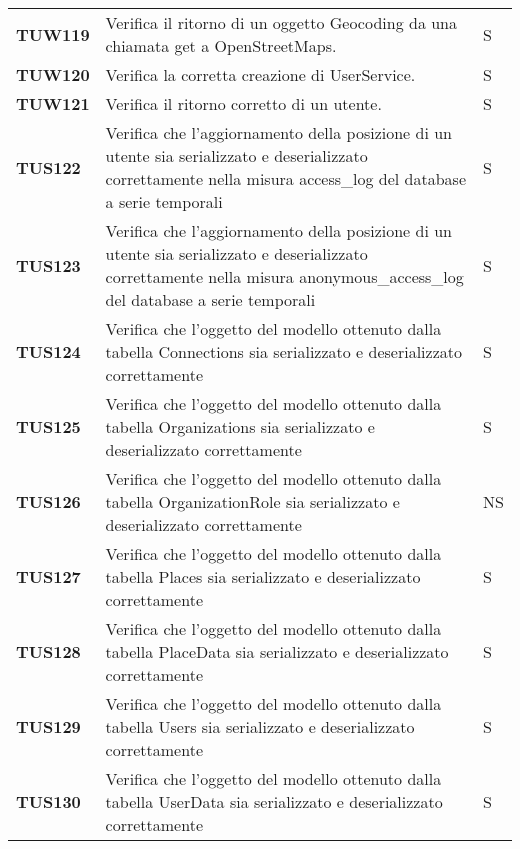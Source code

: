 \documentclass[../../piano-di-qualifica.tex]{subfiles}
\begin{document}
\begin{longtable}[H]{>{\centering\bfseries}m{3cm} >{}m{10cm} >{\centering\arraybackslash}m{3cm}}
  TUW119             & Verifica il ritorno di un oggetto Geocoding da una chiamata get a OpenStreetMaps.                                   & S                             \\


  TUW120             & Verifica la corretta creazione di UserService.                                                                      & S                             \\

  TUW121             & Verifica il ritorno corretto di un utente.                                                                          & S                             \\


  TUS122 & Verifica che l'aggiornamento della posizione di un utente sia serializzato e deserializzato correttamente nella misura access\_log del database a serie temporali & S \\
  TUS123 & Verifica che l'aggiornamento della posizione di un utente sia serializzato e deserializzato correttamente nella misura anonymous\_access\_log del database a serie temporali & S \\


  TUS124 & Verifica che l'oggetto del modello ottenuto dalla tabella Connections sia serializzato e deserializzato correttamente & S \\
  TUS125 & Verifica che l'oggetto del modello ottenuto dalla tabella Organizations sia serializzato e deserializzato correttamente & S \\
  TUS126 & Verifica che l'oggetto del modello ottenuto dalla tabella OrganizationRole sia serializzato e deserializzato correttamente & NS \\
  TUS127 & Verifica che l'oggetto del modello ottenuto dalla tabella Places sia serializzato e deserializzato correttamente & S \\
  TUS128 & Verifica che l'oggetto del modello ottenuto dalla tabella PlaceData sia serializzato e deserializzato correttamente & S \\
  TUS129 & Verifica che l'oggetto del modello ottenuto dalla tabella Users sia serializzato e deserializzato correttamente & S \\
  TUS130 & Verifica che l'oggetto del modello ottenuto dalla tabella UserData sia serializzato e deserializzato correttamente & S \\


\end{longtable}
\end{document}
